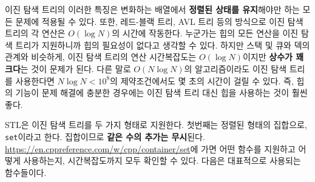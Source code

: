 \begin{figure}[htbp]
    \centering
\end{figure}

이진 탐색 트리의 이러한 특징은 변화하는 배열에서 \textbf{정렬된 상태를 유지}해야만 하는 모든 문제에 적용될 수 있다. 또한, 레드-블랙 트리, AVL 트리 등의 방식으로 이진 탐색 트리의 각 연산은 $O(\log N)$의 시간에 작동한다. 누군가는 힙의 모든 연산을 이진 탐색 트리가 지원하니까 힙의 필요성이 없다고 생각할 수 있다. 하지만 스택 및 큐와 덱의 관계와 비슷하게, 이진 탐색 트리의 연산 시간복잡도는 $O(\log N)$이지만 \textbf{상수가 꽤 크다}는 것이 문제가 된다. 다른 말로 $O(N \log N)$의 알고리즘이라도 이진 탐색 트리를 사용한다면 $N \log N < 10^8$의 제약조건에서도 몇 초의 시간이 걸릴 수 있다. 즉, 힙의 기능이 문제 해결에 충분한 경우에는 이진 탐색 트리 대신 힙을 사용하는 것이 훨씬 좋다.

STL은 이진 탐색 트리를 두 가지 형태로 지원한다. 첫번째는 정렬된 형태의 집합으로, \texttt{set}이라고 한다. 집합이므로 \textbf{같은 수의 추가는 무시}된다. \url{https://en.cppreference.com/w/cpp/container/set}에 가면 어떤 함수를 지원하고 어떻게 사용하는지, 시간복잡도까지 모두 확인할 수 있다. 다음은 대표적으로 사용되는 함수들이다.

